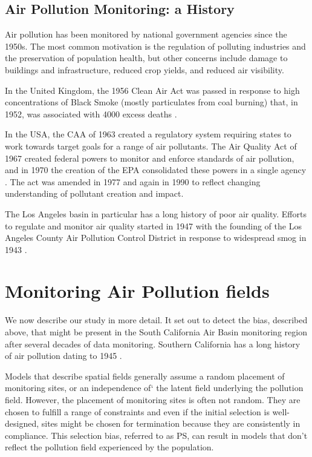 \documentclass{article}
\begin{document}
\subsection{Air Pollution Monitoring: a History}
\label{sec:apmonitoring}
Air pollution has been monitored by national government agencies since the 1950s.  The most common motivation is the regulation of polluting industries and the preservation of population health, but other concerns include damage to buildings and infrastructure, reduced crop yields, and reduced air visibility.  
        
In the United Kingdom, the 1956 Clean Air Act was passed in response to high concentrations of Black Smoke (mostly particulates from coal burning) that, in 1952, was associated with 4000 excess deaths \cite{shaddick2014case}.

In the USA, the \ac{CAA} of 1963 created a regulatory system requiring states to work towards target goals for a range of air pollutants.  The Air Quality Act of 1967 created federal powers to monitor and enforce standards of air pollution, and in 1970 the creation of the \ac{EPA} consolidated these powers in a single agency %
.  The act was amended in 1977 and again in 1990 to reflect changing understanding of pollutant creation and impact.  
 
 The Los Angeles basin in particular has a long history of poor air quality.  Efforts to regulate and monitor air quality started in 1947 with the founding of the Los Angeles County Air Pollution Control District in response to widespread smog in 1943 
 .



\section{Monitoring Air Pollution fields} \label{sec:monitoring}
We now describe our study in more detail. It set out to  detect the bias, described above, that might be present in the South California Air Basin monitoring region after several decades of data monitoring.  Southern California has a long history of air pollution dating to 1945 \citep{CASCAQMD:2015}.
 
Models that describe spatial fields generally assume a random placement of monitoring sites, or an independence of` the latent field underlying the pollution field.  However, the placement of monitoring sites is often not random. They are chosen to fulfill a range of constraints and even if the initial selection is well-designed, sites might be chosen for termination because they are consistently in compliance.  This selection bias, referred to as \ac{PS}, can result in models that don't reflect the pollution field experienced by the population. 
 
\end{document}
